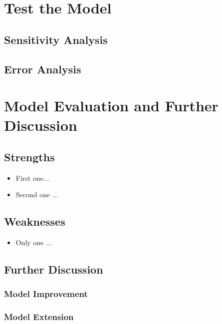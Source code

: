 \documentclass[12pt]{article}  %
\begin{document}
\section{Test the Model}

\subsection{Sensitivity Analysis}

\subsection{Error Analysis}


\section{Model Evaluation and Further Discussion}
\subsection{Strengths}
\begin{itemize}
    \item First one...
    \item Second one ...
\end{itemize}

\subsection{Weaknesses}
\begin{itemize}
    \item Only one ...
 \end{itemize}
 
 \subsection{Further Discussion}
 
 \subsubsection{Model Improvement}
 
 \subsubsection{Model Extension}
\end{document}
